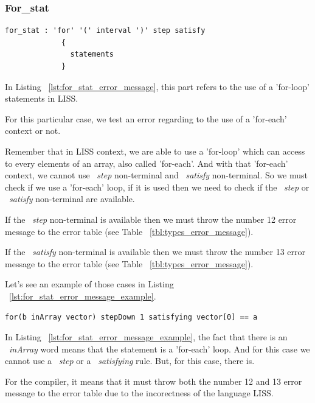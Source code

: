 \documentclass[
  oneside,
  11pt, a4paper,
  footinclude=true,
  headinclude=true,
  cleardoublepage=empty
]{scrbook}
\begin{document}
\subsubsection{For\_stat}

\begin{lstlisting}[caption={For\_stat rule in LISS},label={lst:for_stat_error_message}]
  for_stat : 'for' '(' interval ')' step satisfy
             {
               statements
             }
\end{lstlisting}

In Listing ~\ref{lst:for_stat_error_message}, this part refers to the use of a 'for-loop' statements in LISS.

For this particular case, we test an error regarding to the use of a 'for-each' context or not.

Remember that in LISS context, we are able to use a 'for-loop' which can access to every elements of an array, also called 'for-each'.
And with that 'for-each' context, we cannot use ~\textit{step} non-terminal and ~\textit{satisfy} non-terminal.
So we must check if we use a 'for-each' loop, if it is used then we need to check if the ~\textit{step} or ~\textit{satisfy} non-terminal are available.

If the ~\textit{step} non-terminal is available then we must throw the number 12 error message to the error table (see Table ~\ref{tbl:types_error_message}).

If the ~\textit{satisfy} non-terminal is available then we must throw the number 13 error message to the error table (see Table ~\ref{tbl:types_error_message}).

Let's see an example of those cases in Listing ~\ref{lst:for_stat_error_message_example}.

\begin{lstlisting}[caption={Example of an error message in for\_stat rule},label={lst:for_stat_error_message_example}]
  for(b inArray vector) stepDown 1 satisfying vector[0] == a
\end{lstlisting}

In Listing ~\ref{lst:for_stat_error_message_example}, the fact that there is an ~\textit{inArray} word means that the statement is a 'for-each' loop. And for this case we cannot use a ~\textit{step} or a ~\textit{satisfying} rule. But, for this case, there is.

For the compiler, it means that it must throw both the number 12 and 13 error message to the error table due to the incorectness of the language LISS.
\end{document}
